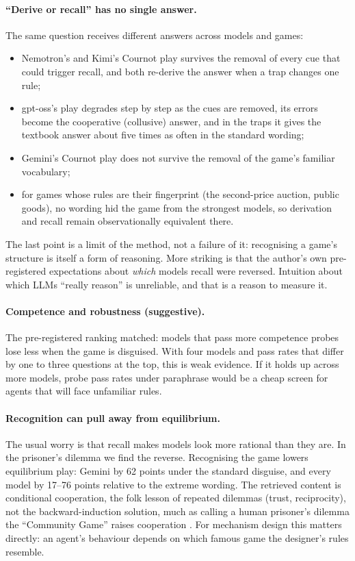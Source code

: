 \documentclass[11pt]{article}
\theoremstyle{definition}
\theoremstyle{remark}
\begin{document}
\paragraph{``Derive or recall'' has no single answer.} The same question receives different
answers across models and games:
\begin{itemize}
\item Nemotron's and Kimi's Cournot play survives the removal of every cue that could trigger
  recall, and both re-derive the answer when a trap changes one rule;
\item gpt-oss's play degrades step by step as the cues are removed, its errors become the
  cooperative (collusive) answer, and in the traps it gives the textbook answer about five
  times as often in the standard wording;
\item Gemini's Cournot play does not survive the removal of the game's familiar vocabulary;
\item for games whose rules are their fingerprint (the second-price auction, public goods), no
  wording hid the game from the strongest models, so derivation and recall remain observationally
  equivalent there.
\end{itemize}
The last point is a limit of the method, not a failure of it: recognising a game's structure is
itself a form of reasoning. More striking is that the author's own pre-registered expectations
about \emph{which} models recall were reversed. Intuition about which LLMs ``really reason'' is
unreliable, and that is a reason to measure it.

\paragraph{Competence and robustness (suggestive).} The pre-registered ranking matched: models
that pass more competence probes lose less when the game is disguised. With four models and pass
rates that differ by one to three questions at the top, this is weak evidence. If it holds up
across more models, probe pass rates under paraphrase would be a cheap screen for agents that will
face unfamiliar rules.

\paragraph{Recognition can pull away from equilibrium.} The usual worry is that recall makes
models look more rational than they are. In the prisoner's dilemma we find the reverse.
Recognising the game lowers equilibrium play: Gemini by 62 points under the standard disguise,
and every model by 17--76 points relative to the extreme wording. The retrieved content is conditional cooperation, the folk
lesson of repeated dilemmas (trust, reciprocity), not the backward-induction solution, much as
calling a human prisoner's dilemma the ``Community Game'' raises cooperation
\citep{liberman2004name}. For
mechanism design this matters directly: an agent's behaviour depends on which famous game the
designer's rules resemble.
\end{document}
